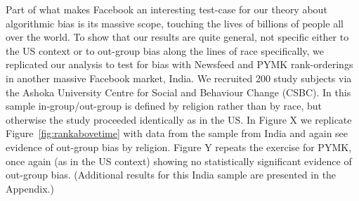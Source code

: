 \documentclass[12pt,letterpaper]{article}
\begin{document}
Part of what makes Facebook an interesting test-case for our theory about algorithmic bias is its massive scope, touching the lives of billions of people all over the world. To show that our results are quite general, not specific either to the US context or to out-group bias along the lines of race specifically, we replicated our analysis to test for bias with Newsfeed and PYMK rank-orderings in another massive Facebook market, India. We recruited 200 study subjects via the Ashoka University Centre for Social and Behaviour Change (CSBC). In this sample in-group/out-group is defined by religion rather than by race, but otherwise the study proceeded identically as in the US. In Figure X we replicate Figure~\ref{fig:rankabovetime} with data from the sample from India and again see evidence of out-group bias by religion. Figure Y repeats the exercise for PYMK, once again (as in the US context) showing no statistically significant evidence of out-group bias. (Additional results for this India sample are presented in the Appendix.)




\end{document}
